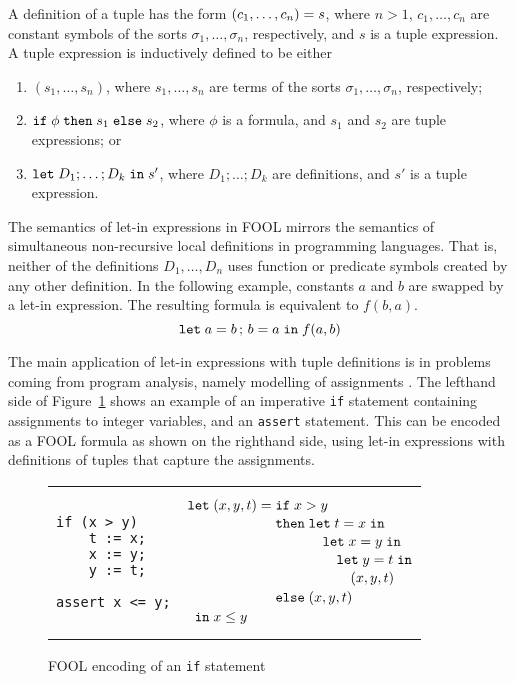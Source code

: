\documentclass{easychair}
\begin{document}
A definition of a tuple has the form ${(c_1,\ldots,c_n)}={s}$, where
$n > 1$, $c_1,\ldots,c_n$ are constant symbols of the sorts
$\sigma_1,\ldots,\sigma_n$, respectively, and $s$ is a tuple expression.
A tuple expression is inductively defined to be either
\begin{enumerate}
  \item $(s_1,\ldots,s_n)$, where $s_1,\ldots,s_n$ are terms of the sorts
        $\sigma_1,\ldots,\sigma_n$, respectively;
  \item $\mathtt{if}\;{\phi}\;\allowbreak\mathtt{then}\;{s_1}\;\allowbreak\mathtt{else}\;{s_2}$, where $\phi$ is a formula, and $s_1$ and $s_2$
        are tuple expressions; or
  \item $\mathtt{let}\;{D_1;\ldots;D_k}\;\allowbreak\mathtt{in}\;{s'}$, where $D_1;\ldots;D_k$ are definitions,
        and $s'$ is a tuple expression.
\end{enumerate}
The semantics of let-in expressions in FOOL mirrors the semantics of
simultaneous non-recursive local definitions in programming languages. That is,
neither of the definitions $D_1,\ldots,\allowbreak D_n$ uses function or
predicate symbols created by any other definition. In the following example,
constants $a$ and $b$ are swapped by a let-in expression. The resulting formula
is equivalent to $f(b, a)$.
\begin{equation}\label{eq:parallel-let-example}
\mathtt{let}\;{a}={b}\,;\,{b}={a}\;\mathtt{in}\;f(a, b)
\end{equation}

The main application of let-in expressions with tuple definitions is in 
problems coming from program analysis, namely modelling of assignments
\cite{KKV18}.
The lefthand side of Figure~\ref{fig:simple-if} shows an example of an 
imperative \texttt{if} statement containing assignments to integer variables, 
and an \texttt{assert} statement. 
This can be encoded as a FOOL formula as shown on the righthand side, using 
let-in expressions with definitions of tuples that capture the assignments.

\begin{figure}[htbp]
\begin{center}
\begin{tabular}[t]{ll}
\begin{minipage}{0.3\textwidth}
\begin{verbatim}
if (x > y) 
    t := x;
    x := y;
    y := t;

assert x <= y;
\end{verbatim}
\end{minipage}
&
\begin{minipage}{0.3\textwidth}
\[
  \letnl{(x,y,t)}{\itenll{x > y}
                 {\letinnl{t}{x}
                          {\letinnl{x}{y}
                                   {\letinnl{y}{t}
                                            {(x,y,t)}}}}
                 {(x,y,t)}}
        {x \le y}
\]
\end{minipage}
\\
\end{tabular}
\end{center}
\caption{FOOL encoding of an {\tt if} statement}
\label{fig:simple-if}
\end{figure}
\end{document}

